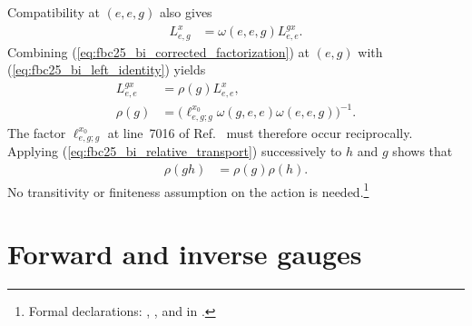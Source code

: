\documentclass{article}
\begin{document}
Compatibility at $(e,e,g)$ also gives
\begin{align}
    L^x_{e,g}
        &=\omega(e,e,g)L^{g x}_{e,e}.
    \label{eq:fbc25_bi_left_identity}
\end{align}
Combining (\ref{eq:fbc25_bi_corrected_factorization}) at $(e,g)$ with
(\ref{eq:fbc25_bi_left_identity}) yields
\begin{align}
    L^{g x}_{e,e}
        &=\rho(g)L^x_{e,e},
    \label{eq:fbc25_bi_relative_transport}\\
    \rho(g)
        &=\bigl(\ell^{x_0}_{e,g;g}\omega(g,e,e)
            \omega(e,e,g)\bigr)^{-1}.
    \label{eq:fbc25_bi_corrected_relative_character}
\end{align}
The factor $\ell^{x_0}_{e,g;g}$ at line~7016 of
Ref.~\cite{FrancoRubio2025MPUGauging} must therefore occur reciprocally.
Applying (\ref{eq:fbc25_bi_relative_transport}) successively to $h$ and $g$
shows that
\begin{align}
    \rho(gh)
        &=\rho(g)\rho(h).
    \label{eq:fbc25_bi_character_multiplicativity}
\end{align}
No transitivity or finiteness assumption on the action is needed.\footnote{Formal
declarations: ,
, and
 in
.}

\section{Forward and inverse gauges}
\end{document}

